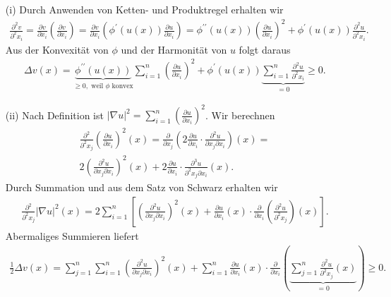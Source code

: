 \begin{solution}
\phantom{}
  \begin{itemize}

  \item[(i)] Durch Anwenden von Ketten- und Produktregel erhalten wir
  \begin{align*}
      \frac{\partial^2 v}{\partial^2 x_i} = \frac{\partial v}{\partial x_i} \left(\frac{\partial v}{\partial x_i}\right) = \frac{\partial v}{\partial x_i} \left(\phi^\prime(u(x)) \frac{\partial u}{\partial x_i}\right) = \phi^{\prime\prime}(u(x)) \left(\frac{\partial u}{\partial x_i}\right)^2 + \phi^\prime(u(x)) \frac{\partial^2 u}{\partial^2 x_i}.
  \end{align*}
  Aus der Konvexität von $\phi$ und der Harmonität von $u$ folgt daraus
  \begin{align*}
      \Delta v(x) = \underbrace{\phi^{\prime\prime}(u(x))}_{\geq 0, \text{~weil $\phi$ konvex}} \sum_{i=1}^n \left(\frac{\partial u}{\partial x_i}\right)^2 + \phi^\prime(u(x)) \underbrace{\sum_{i=1}^n \frac{\partial^2 u}{\partial^2 x_i}}_{= 0} \geq 0.
  \end{align*}
  \item[(ii)] Nach Definition ist $|\nabla u|^2 = \sum_{i=1}^n \left(\frac{\partial u}{\partial x_i}\right)^2$. Wir berechnen
\begin{align*}
    \frac{\partial^2}{\partial^2 x_j} \left(\frac{\partial u}{\partial x_i}\right)^2 (x) = \frac{\partial}{\partial x_j} \left(2 \frac{\partial u}{\partial x_i} \cdot \frac{\partial^2 u}{\partial x_j \partial x_i} \right)(x) = \\
    2 \left(\frac{\partial^2 u}{\partial x_j \partial x_i}\right)^2 (x) + 2\frac{\partial u}{\partial x_i} \cdot \frac{\partial^3 u}{\partial^2 x_j \partial x_i} (x).
\end{align*}
Durch Summation und aus dem Satz von Schwarz erhalten wir
\begin{align*}
    \frac{\partial^2}{\partial^2 x_j} |\nabla u|^2 (x) = 2 \sum_{i=1}^n \left[ \left(\frac{\partial^2 u}{\partial x_j \partial x_i} \right)^2(x) + \frac{\partial u}{\partial x_i}(x) \cdot \frac{\partial}{\partial x_i} \left(\frac{\partial^2 u}{\partial^2 x_j}\right)(x) \right].
\end{align*}
Abermaliges Summieren liefert
\begin{align*}
    \frac{1}{2} \Delta v (x) = \sum_{j=1}^n \sum_{i=1}^n \left(\frac{\partial^2 u}{\partial x_j \partial x_i} \right)^2(x) +
    \sum_{i=1}^n \frac{\partial u}{\partial x_i}(x) \cdot \frac{\partial}{\partial x_i} \left( \underbrace{\sum_{j=1}^n \frac{\partial^2 u}{\partial^2 x_j}(x)}_{= 0} \right) \geq 0.
\end{align*}
  \end{itemize}

\end{solution}


